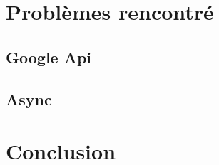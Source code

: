 \documentclass[a4paper]{article}
\newcommand{\rpi}{\emph{Raspbery Pi}}
\begin{document}

\pagebreak

\section{Problèmes rencontré}
\subsection{Google Api}
\subsection{Async}

\section{Conclusion}

\pagebreak



\listoffigures
\end{document}
